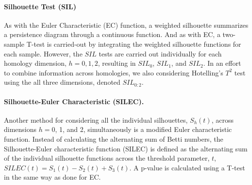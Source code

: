 \documentclass[12pt]{article}
\begin{document}
\paragraph{Silhouette Test (SIL)}
As with the Euler Characteristic (EC) function, a weighted silhouette summarizes a persistence diagram through a continuous function. And as with EC, a two-sample T-test is carried-out by integrating the weighted silhouette functions for each sample.  However, the $SIL$ tests are carried out individually for each homology dimension, $h = 0, 1, 2$, resulting in $SIL_0$, $SIL_1$, and $SIL_2$. In an effort to combine information across homologies, we also considering Hotelling's $T^2$ test using the all three dimensions, denoted $SIL_{0:2}$.



\paragraph{Silhouette-Euler Characteristic (SILEC).}
Another method for considering all the individual silhouettes, $S_{h}(t)$, across dimensions $h = 0$, 1, and 2, simultaneously is a modified Euler characteristic function. Instead of calculating the alternating sum of Betti numbers, the Silhouette-Euler characteristic function (SILEC) is defined as the alternating sum of the individual silhouette functions across the threshold parameter, $t$, $SILEC(t) =  S_{1}(t) - S_{2}(t) + S_{3}(t)$.
A p-value is calculated using a T-test in the same way as done for EC.
\end{document}
